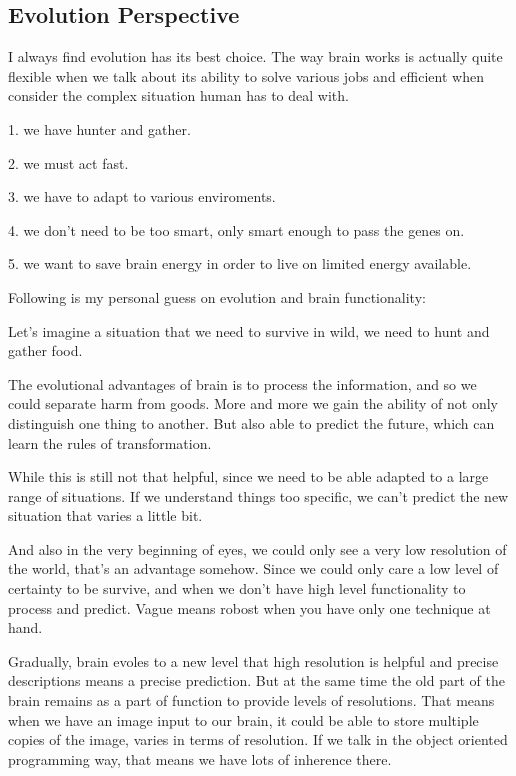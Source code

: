 \subsection*{Evolution Perspective}

I always find evolution has its best choice. The way brain works is actually quite flexible when we talk about its ability to solve various jobs and efficient when consider the complex situation human has to deal with.

1. we have hunter and gather.

2. we must act fast.

3. we have to adapt to various enviroments.

4. we don't need to be too smart, only smart enough to pass the genes on.

5. we want to save brain energy in order to live on limited energy available.

Following is my personal guess on evolution and brain functionality:

Let's imagine a situation that we need to survive in wild, we need to hunt and gather food.

The evolutional advantages of brain is to process the information, and so we could separate harm from goods. More and more we gain the ability of not only distinguish one thing to another. But also able to predict the future, which can learn the rules of transformation.

While this is still not that helpful, since we need to be able adapted to a large range of situations. If we understand things too specific, we can't predict the new situation that varies a little bit.

And also in the very beginning of eyes, we could only see a very low resolution of the world, that's an advantage somehow. Since we could only care a low level of certainty to be survive, and when we don't have high level functionality to process and predict. Vague means robost when you have only one technique at hand.

Gradually, brain evoles to a new level that high resolution is helpful and precise descriptions means a precise prediction. But at the same time the old part of the brain remains as a part of function to provide levels of resolutions. That means when we have an image input to our brain, it could be able to store multiple copies of the image, varies in terms of resolution. If we talk in the object oriented programming way, that means we have lots of inherence there.

